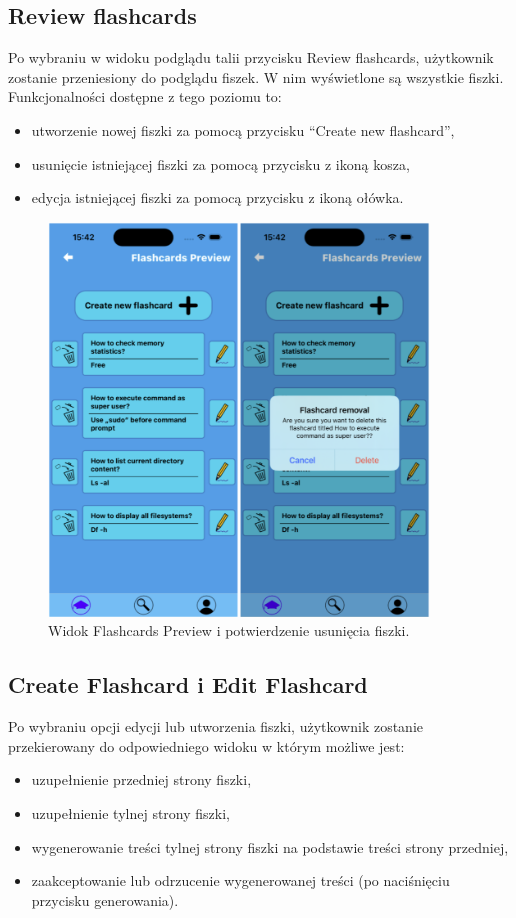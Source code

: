 \subsection{Review flashcards}
Po wybraniu w widoku podglądu talii przycisku Review flashcards, użytkownik zostanie przeniesiony do podglądu fiszek. W nim wyświetlone są wszystkie fiszki. Funkcjonalności dostępne z tego poziomu to:
\begin{itemize}
    \item utworzenie nowej fiszki za pomocą przycisku “Create new flashcard”,
    \item usunięcie istniejącej fiszki za pomocą przycisku z ikoną kosza,
    \item edycja istniejącej fiszki za pomocą przycisku z ikoną ołówka.
\end{itemize}


\begin{figure}[H]
    \centering
    \includegraphics[width=0.9\textwidth]{chapters/chapter_10/images_mobile/mobile_flashcards_preview}
    \caption{Widok Flashcards Preview i potwierdzenie usunięcia fiszki.}
    \label{img:mobile_flashcards_preview}
\end{figure}


\subsection{Create Flashcard i Edit Flashcard}
Po wybraniu opcji edycji lub utworzenia fiszki, użytkownik zostanie przekierowany do odpowiedniego widoku w którym możliwe jest:
\begin{itemize}
    \item uzupełnienie przedniej strony fiszki,
    \item uzupełnienie tylnej strony fiszki,
    \item wygenerowanie treści tylnej strony fiszki na podstawie treści strony przedniej,
    \item zaakceptowanie lub odrzucenie wygenerowanej treści (po naciśnięciu przycisku generowania).
\end{itemize}


